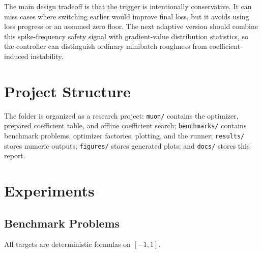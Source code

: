 \documentclass[11pt]{article}
\begin{document}
The main design tradeoff is that the trigger is intentionally conservative. It
can miss cases where switching earlier would improve final loss, but it avoids
using loss progress or an assumed zero floor. The next adaptive version should
combine this spike-frequency safety signal with gradient-value distribution
statistics, so the controller can distinguish ordinary minibatch roughness from
coefficient-induced instability.

\section{Project Structure}

The folder is organized as a research project: \texttt{muon/} contains the
optimizer, prepared coefficient table, and offline coefficient search;
\texttt{benchmarks/} contains benchmark problems, optimizer factories,
plotting, and the runner; \texttt{results/} stores numeric outputs;
\texttt{figures/} stores generated plots; and \texttt{docs/} stores this
report.

\section{Experiments}

\subsection{Benchmark Problems}

All targets are deterministic formulas on $[-1,1]$.
\end{document}
